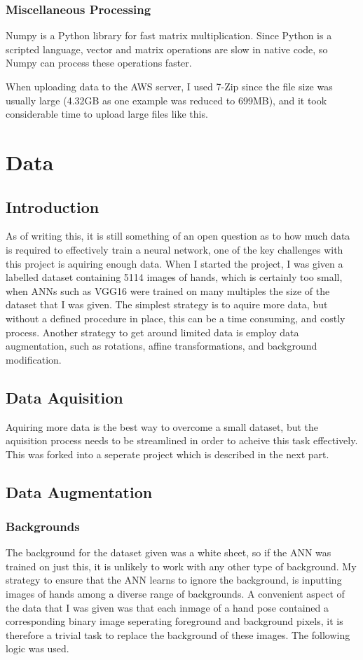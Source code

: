         \subsubsection{Miscellaneous Processing}
        Numpy is a Python library for fast matrix multiplication. Since Python is a scripted language, vector and matrix operations are slow in native code, so Numpy can process these operations faster.

        When uploading data to the AWS server, I used 7-Zip since the file size was usually large (4.32GB as one example was reduced to 699MB), and it took considerable time to upload large files like this.


\section{Data}
    \subsection{Introduction}
    As of writing this, it is still something of an open question as to how much data is required to effectively train a neural network, one of the key challenges with this project is aquiring enough data. When I started the project, I was given a labelled dataset containing 5114 images of hands, which is certainly too small, when ANNs such as VGG16 \cite{vggnet} were trained on many multiples the size of the dataset that I was given. The simplest strategy is to aquire more data, but without a defined procedure in place, this can be a time consuming, and costly process. Another strategy to get around limited data is employ data augmentation, such as rotations, affine transformations, and background modification.

    \subsection{Data Aquisition}
    Aquiring more data is the best way to overcome a small dataset, but the aquisition process needs to be streamlined in order to acheive this task effectively. This was forked into a seperate project which is described in the next part.

    \subsection{Data Augmentation}
        \subsubsection{Backgrounds}
        The background for the dataset given was a white sheet, so if the ANN was trained on just this, it is unlikely to work with any other type of background. My strategy to ensure that the ANN learns to ignore the background, is inputting images of hands among a diverse range of backgrounds. A convenient aspect of the data that I was given was that each inmage of a hand pose contained a corresponding binary image seperating foreground and background pixels, it is therefore a trivial task to replace the background of these images. The following logic was used.

